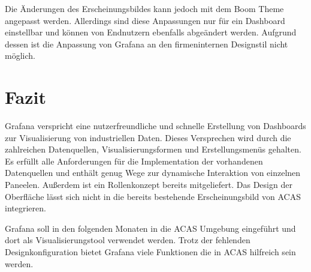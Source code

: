 \documentclass[a4paper, 12pt, oneside]{scrbook}
\begin{document}
	
	\noindent Die Änderungen des Erscheinungsbildes kann jedoch mit dem \glqq Boom Theme\grqq{} angepasst werden. Allerdings sind diese Anpassungen nur für ein Dashboard einstellbar und können von Endnutzern ebenfalls abgeändert werden. Aufgrund dessen ist die Anpassung von Grafana an den firmeninternen Designstil nicht möglich.
	
	\chapter{Fazit}
		
	\noindent Grafana verspricht eine nutzerfreundliche und schnelle Erstellung von Dashboards zur Visualisierung von industriellen Daten. Dieses Versprechen wird durch die zahlreichen Datenquellen, Visualisierungsformen und Erstellungsmenüs gehalten. Es erfüllt alle Anforderungen für die Implementation der vorhandenen Datenquellen und enthält genug Wege zur dynamische Interaktion von einzelnen Paneelen. Außerdem ist ein Rollenkonzept bereits mitgeliefert. Das Design der Oberfläche lässt sich nicht in die bereits bestehende Erscheinungsbild von ACAS integrieren.

	\noindent Grafana soll in den folgenden Monaten in die ACAS Umgebung eingeführt und dort als Visualisierungstool verwendet werden. Trotz der fehlenden Designkonfiguration bietet Grafana viele Funktionen die in ACAS hilfreich sein werden.
	
	\frontmatter
	\printbibliography
\end{document}
